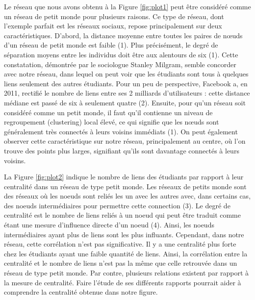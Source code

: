 \documentclass[9pt,twocolumn,twoside,]{pnas-new}
\begin{document}
Le réseau que nous avons obtenu à la Figure \ref{fig:plot1} peut être
considéré comme un réseau de petit monde pour plusieurs raisons. Ce type
de réseau, dont l'exemple parfait est les réseaux sociaux, repose
principalement sur deux caractéristiques. D'abord, la distance moyenne
entre toutes les paires de nœuds d'un réseau de petit monde est faible
(1). Plus précisément, le degré de séparation moyens entre les individus
doit être aux alentours de six (1). Cette constatation, démontrée par le
sociologue Stanley Milgram, semble concorder avec notre réseau, dans
lequel on peut voir que les étudiants sont tous à quelques liens
seulement des autres étudiants. Pour un peu de perspective, Facebook a,
en 2011, rectifié le nombre de liens entre ses 2 milliards
d'utilisateurs : cette distance médiane est passé de six à seulement
quatre (2). Ensuite, pour qu'un réseau soit considéré comme un petit
monde, il faut qu'il contienne un niveau de regroupement (clustering)
local élevé, ce qui signifie que les nœuds sont généralement très
connectés à leurs voisins immédiats (1). On peut également observer
cette caractéristique sur notre réseau, principalement au centre, où
l'on trouve des points plus larges, signifiant qu'ils sont davantage
connectés à leurs voisins.

La Figure \ref{fig:plot2} indique le nombre de liens des étudiants par
rapport à leur centralité dans un réseau de type petit monde. Les
réseaux de petits monde sont des réseaux où les noeuds sont reliés les
un avec les autres avec, dans certains cas, des noeuds intermédiaires
pour permettre cette connection (3). Le degré de centralité est le
nombre de liens reliés à un noeud qui peut être traduit comme étant une
mesure d'influence directe d'un noeud (4). Ainsi, les noeuds
intermédiaires ayant plus de liens sont les plus influants. Cependant,
dans notre réseau, cette corrélation n'est pas significative. Il y a une
centralité plus forte chez les étudiants ayant une faible quantité de
liens. Ainsi, la corrélation entre la centralité et le nombre de liens
n'est pas la même que celle retrouvée dans un réseau de type petit
monde. Par contre, plusieurs relations existent par rapport à la mesure
de centralité. Faire l'étude de ses différents rapports pourrait aider à
comprendre la centralité obtenue dans notre figure.
\end{document}
